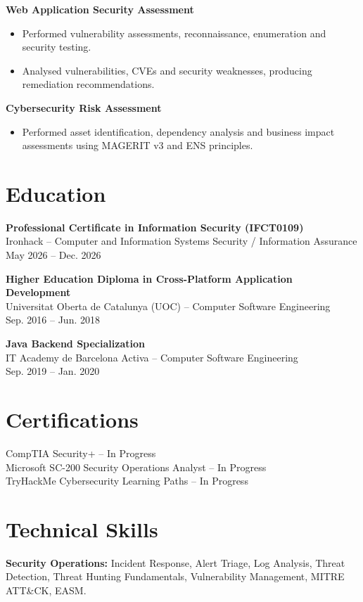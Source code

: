 \documentclass[10pt,a4paper]{article}
\begin{document}
\textbf{Web Application Security Assessment}
\begin{itemize}
\item Performed vulnerability assessments, reconnaissance, enumeration and security testing.
\item Analysed vulnerabilities, CVEs and security weaknesses, producing remediation recommendations.
\end{itemize}

\textbf{Cybersecurity Risk Assessment}
\begin{itemize}
\item Performed asset identification, dependency analysis and business impact assessments using MAGERIT v3 and ENS principles.
\end{itemize}

\section*{Education}
\textbf{Professional Certificate in Information Security (IFCT0109)}\\
Ironhack -- Computer and Information Systems Security / Information Assurance\\
May 2026 -- Dec. 2026

\textbf{Higher Education Diploma in Cross-Platform Application Development}\\
Universitat Oberta de Catalunya (UOC) -- Computer Software Engineering\\
Sep. 2016 -- Jun. 2018

\textbf{Java Backend Specialization}\\
IT Academy de Barcelona Activa -- Computer Software Engineering\\
Sep. 2019 -- Jan. 2020

\section*{Certifications}
CompTIA Security+ -- In Progress\\
Microsoft SC-200 Security Operations Analyst -- In Progress\\
TryHackMe Cybersecurity Learning Paths -- In Progress

\section*{Technical Skills}
\textbf{Security Operations:} Incident Response, Alert Triage, Log Analysis, Threat Detection, Threat Hunting Fundamentals, Vulnerability Management, MITRE ATT\&CK, EASM.
\end{document}
